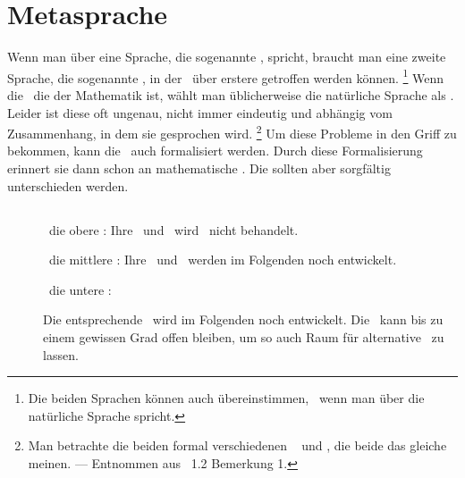 \section     {Metasprache}%
\label   {sec:Metasprache}

Wenn man über eine Sprache, die sogenannte \Objektsprache, spricht, braucht man eine zweite Sprache, die sogenannte \Metasprache, in der \Aussagen\ über erstere getroffen werden können.%
\footnote{%
	Die beiden Sprachen können auch übereinstimmen, \textzB\ wenn man über die natürliche Sprache spricht.
}
Wenn die \Objektsprache\ die der Mathematik ist, wählt man üblicherweise die natürliche Sprache als \Metasprache.
Leider ist diese oft ungenau, nicht immer eindeutig und abhängig vom Zusammenhang, in dem sie gesprochen wird.%
\footnote{%
	Man betrachte die beiden formal verschiedenen \Aussagen\  und , die beide das gleiche meinen.
	--- Entnommen aus \cite{bib:Rautenberg} \sectionname~1.2 Bemerkung 1.
}
Um diese Probleme in den Griff zu bekommen, kann die \Metasprache\ auch formalisiert werden.
Durch diese Formalisierung erinnert sie dann schon an mathematische \Formeln.
Die  sollten aber sorgfältig unterschieden werden.

\subsection[Sprachebenen]{\Sprachebenen}%
\label {sub:Sprachebenen}

\begin{description}
	\item[] \Hier\ die obere \Sprachebene:
	Ihre \Syntax\ und \Semantik\ wird \hier\ nicht behandelt.

	\item[] \Hier\ die mittlere \Sprachebene:
	Ihre \Syntax\ und \Semantik\ werden im Folgenden noch entwickelt.

	\item[] \Hier\ die untere \Sprachebene:

	Die entsprechende \Syntax\ wird im Folgenden noch entwickelt.
	Die \Semantik\ kann bis zu einem gewissen Grad offen bleiben, um so auch Raum für alternative \Logiken\ zu lassen.
\end{description}

